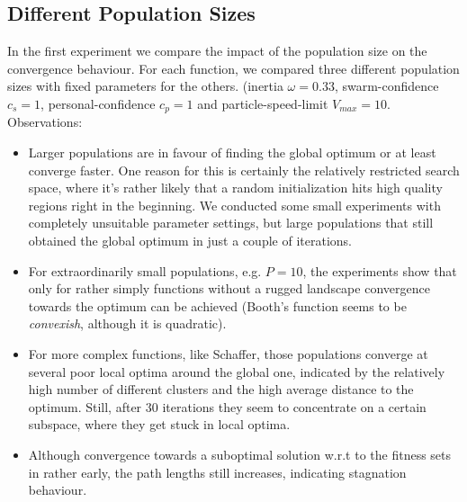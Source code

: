 \documentclass[12pt]{article}
\begin{document}
\subsection{Different Population Sizes}
In the first experiment we compare the impact of the population size on the convergence behaviour. For each function, we compared three different population sizes with fixed parameters for the others. (inertia $\omega=0.33$, swarm-confidence $c_s=1$, personal-confidence $c_p=1$ and particle-speed-limit $V_{max}=10$.
Observations:
\begin{itemize}
	\item Larger populations are in favour of finding the global optimum or at least converge faster. One reason for this is certainly the relatively restricted search space, where it's rather likely that a random initialization hits high quality regions right in the beginning. We conducted some small experiments with completely unsuitable parameter settings, but large populations that still obtained the global optimum in just a couple of iterations. 
	\item For extraordinarily small populations, e.g. $P=10$, the experiments show that only for rather simply functions without a rugged landscape convergence towards the optimum can be achieved (Booth's function seems to be \emph{convexish}, although it is quadratic). 
	\item For more complex functions, like Schaffer, those populations converge at several poor local optima around the global one, indicated by the relatively high number of different clusters and the high average distance to the optimum. Still, after $30$ iterations they seem to concentrate on a certain subspace, where they get stuck in local optima. 
	\item Although convergence towards a suboptimal solution w.r.t to the fitness sets in rather early, the path lengths still increases, indicating stagnation behaviour. 
\end{itemize}
\end{document}
